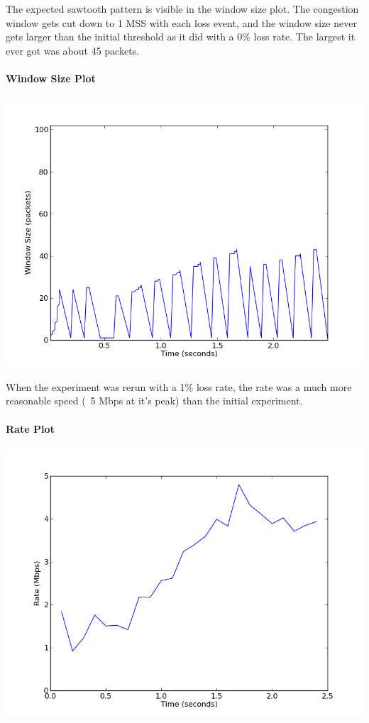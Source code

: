 \documentclass[11pt]{article}
\begin{document}
The expected sawtooth pattern is visible in the window size plot. The congestion window gets cut down to 1 MSS with each loss event, and the window size never gets larger than the initial threshold as it did with a 0\% loss rate. The largest it ever got was about 45 packets.

\paragraph{Window Size Plot} \hspace{2mm}
\begin{center}
\includegraphics[width=15cm]{../plot/one_flow_1_loss/window_size.png}
\end{center}

When the experiment was rerun with a 1\% loss rate, the rate was a much more reasonable speed (~5 Mbps at it's peak) than the initial experiment.

\paragraph{Rate Plot} \hspace{2mm}
\begin{center}
\includegraphics[width=15cm]{../plot/one_flow_1_loss/rate.png}
\end{center}
\end{document}
